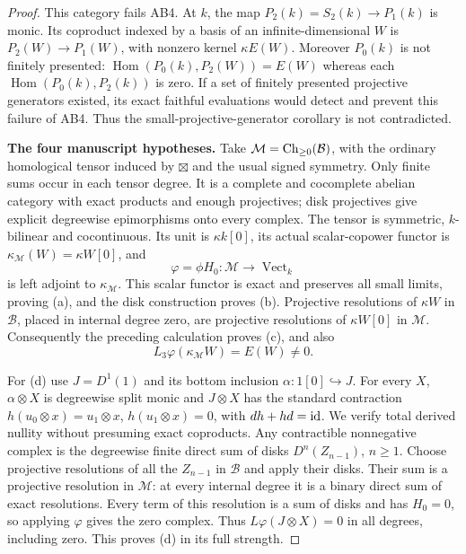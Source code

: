 \begin{proof}
This category fails AB4. At $k$, the map $P_2(k)=S_2(k)\to P_1(k)$ is monic. Its coproduct indexed by a basis of an infinite-dimensional $W$ is $P_2(W)\to P_1(W)$, with nonzero kernel $\kappa E(W)$. Moreover $P_0(k)$ is not finitely presented: $\operatorname{Hom}(P_0(k),P_2(W))=E(W)$ whereas each $\operatorname{Hom}(P_0(k),P_2(k))$ is zero. If a set of finitely presented projective generators existed, its exact faithful evaluations would detect and prevent this failure of AB4. Thus the small-projective-generator corollary is not contradicted.


\textbf{The four manuscript hypotheses.}
Take $\mathcal M=\operatorname{Ch}_{\geq0}(\mathcal B)$, with the ordinary homological tensor induced by $\boxtimes$ and the usual signed symmetry. Only finite sums occur in each tensor degree. It is a complete and cocomplete abelian category with exact products and enough projectives; disk projectives give explicit degreewise epimorphisms onto every complex. The tensor is symmetric, $k$-bilinear and cocontinuous. Its unit is $\kappa k[0]$, its actual scalar-copower functor is $\kappa_{\mathcal M}(W)=\kappa W[0]$, and
\[
\varphi=\phi H_0:\mathcal M\longrightarrow\operatorname{Vect}_k
\]
is left adjoint to $\kappa_{\mathcal M}$. This scalar functor is exact and preserves all small limits, proving (a), and the disk construction proves (b). Projective resolutions of $\kappa W$ in $\mathcal B$, placed in internal degree zero, are projective resolutions of $\kappa W[0]$ in $\mathcal M$. Consequently the preceding calculation proves (c), and also
\[
L_3\varphi(\kappa_{\mathcal M}W)=E(W)\ne0.
\]

For (d) use $J=D^1(1)$ and its bottom inclusion $\alpha:1[0]\hookrightarrow J$. For every $X$, $\alpha\otimes X$ is degreewise split monic and $J\otimes X$ has the standard contraction $h(u_0\otimes x)=u_1\otimes x$, $h(u_1\otimes x)=0$, with $dh+hd=\operatorname{id}$. We verify total derived nullity without presuming exact coproducts. Any contractible nonnegative complex is the degreewise finite direct sum of disks $D^n(Z_{n-1})$, $n\geq1$. Choose projective resolutions of all the $Z_{n-1}$ in $\mathcal B$ and apply their disks. Their sum is a projective resolution in $\mathcal M$: at every internal degree it is a binary direct sum of exact resolutions. Every term of this resolution is a sum of disks and has $H_0=0$, so applying $\varphi$ gives the zero complex. Thus $L\varphi(J\otimes X)=0$ in all degrees, including zero. This proves (d) in its full strength.


\end{proof}
